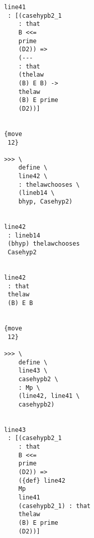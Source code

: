 \documentclass[12pt]{article}
\begin{document}
\begin{verbatim}
                                       line41 
                                        : [(casehypb2_1 
                                           : that 
                                           B <<= 
                                           prime 
                                           (D2)) => 
                                           (--- 
                                           : that 
                                           (thelaw 
                                           (B) E B) -> 
                                           thelaw 
                                           (B) E prime 
                                           (D2))]


                                       {move 
                                        12}

                                       >>> \
                                           define \
                                           line42 \
                                           : thelawchooses \
                                           (lineb14 \
                                           bhyp, Casehyp2)


                                       line42 
                                        : lineb14 
                                        (bhyp) thelawchooses 
                                        Casehyp2


                                       line42 
                                        : that 
                                        thelaw 
                                        (B) E B


                                       {move 
                                        12}

                                       >>> \
                                           define \
                                           line43 \
                                           casehypb2 \
                                           : Mp \
                                           (line42, line41 \
                                           casehypb2)


                                       line43 
                                        : [(casehypb2_1 
                                           : that 
                                           B <<= 
                                           prime 
                                           (D2)) => 
                                           ({def} line42 
                                           Mp 
                                           line41 
                                           (casehypb2_1) : that 
                                           thelaw 
                                           (B) E prime 
                                           (D2))]



\end{verbatim}
\end{document}

